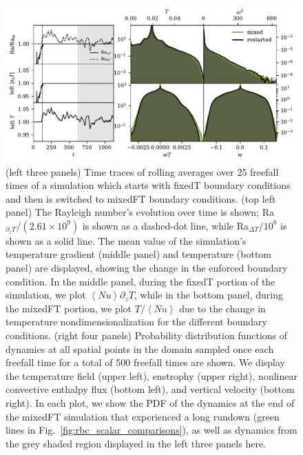 \documentclass[aps, pre, onecolumn, nofootinbib, notitlepage, groupedaddress, amsfonts, amssymb, amsmath, longbibliography]{revtex4-1}
\newcommand{\angles}[1]{\ensuremath{\left\langle #1 \right\rangle}}
\begin{document}
\begin{figure}
\includegraphics[width=\textwidth]{./figs/rbc_restart_description.pdf}
\caption{ 
	(left three panels) Time traces of rolling averages over 25 freefall times of a simulation which starts with fixedT boundary conditions and then is switched to mixedFT boundary conditions.
	(top left panel) The Rayleigh number's evolution over time is shown; Ra$_{\partial_z T}/(2.61\times 10^9)$ is shown as a dashed-dot line, while Ra$_{\Delta T}/10^8$ is shown as a solid line.
	The mean value of the simulation's temperature gradient (middle panel) and temperature (bottom panel) are displayed, showing the change in the enforced boundary condition.
	In the middle panel, during the fixedT portion of the simulation, we plot $\angles{Nu}\partial_z T$, while in the bottom panel, during the mixedFT portion, we plot $T / \angles{Nu}$ due to the change in temperature nondimensionalization for the different boundary conditions.
	(right four panels) Probability distribution functions of dynamics at all spatial points in the domain sampled once each freefall time for a total of 500 freefall times are shown.
	We display the temperature field (upper left), enstrophy (upper right), nonlinear convective enthalpy flux (bottom left), and vertical velocity (bottom right).
	In each plot, we show the PDF of the dynamics at the end of the mixedFT simulation that experienced a long rundown (green lines in Fig.~\ref{fig:rbc_scalar_comparisons}), as well as dynamics from the grey shaded region displayed in the left three panels here.
\label{fig:rbc_restart_description} }
\end{figure}
\end{document}
